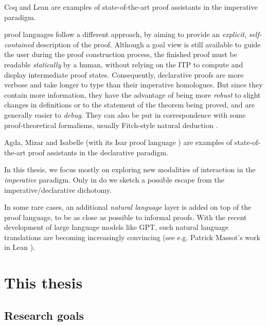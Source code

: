 \begin{description}[labelsep=0pt]
  Coq and Lean are examples of state-of-the-art proof assistants in the
  imperative paradigm.
  
  \item[Declarative~]proof languages follow a different approach, by
  aiming to provide an \emph{explicit}, \emph{self-contained} description of the
  proof. Although a goal view is still available to guide the user during the
  proof construction process, the finished proof must be readable
  \emph{statically} by a human, without relying on the ITP to compute and
  display intermediate proof states. Consequently, declarative proofs are more
  verbose and take longer to type than their imperative homologues. But since
  they contain more information, they have the advantage of being more
  \emph{robust} to slight changes in definitions or to the statement of the
  theorem being proved, and are generally easier to \emph{debug}. They can also
  be put in correspondence with some proof-theoretical formalisms, usually
  Fitch-style natural deduction \cite{geuvers_proof_2009}.
  
  Agda, Mizar and Isabelle (with its Isar proof language ) are
  examples of state-of-the-art proof assistants in the declarative paradigm.
\end{description}

\begin{emphpar}
  In this thesis, we focus mostly on exploring new modalities of interaction in
  the \emph{imperative} paradigm. Only in  do we
  sketch a possible escape from the imperative/declarative dichotomy.
\end{emphpar}

\begin{remark}
In some rare cases, an additional \emph{natural language} layer is added on top
of the proof language, to be as close as possible to informal proofs. With the
recent development of large language models like GPT, such natural language
translations are becoming increasingly convincing (see e.g. Patrick Massot's
work in Lean \cite{LeanIPAM}).
\end{remark}


\section{This thesis}

\subsection{Research goals}

